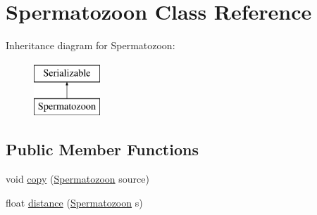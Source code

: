 \hypertarget{classdata_1_1_spermatozoon}{}\section{Spermatozoon Class Reference}
\label{classdata_1_1_spermatozoon}
Inheritance diagram for Spermatozoon\+:\begin{figure}[H]
\begin{center}
\leavevmode
\includegraphics[height=2.000000cm]{classdata_1_1_spermatozoon}
\end{center}
\end{figure}
\subsection*{Public Member Functions}
\begin{DoxyCompactItemize}
\item 
void \hyperlink{classdata_1_1_spermatozoon_ac4622d389badba1a387ec1e139d35c8e}{copy} (\hyperlink{classdata_1_1_spermatozoon}{Spermatozoon} source)
\item 
float \hyperlink{classdata_1_1_spermatozoon_aaef7a8e7602a08c82ea5fcbb777883e0}{distance} (\hyperlink{classdata_1_1_spermatozoon}{Spermatozoon} s)
\end{DoxyCompactItemize}
